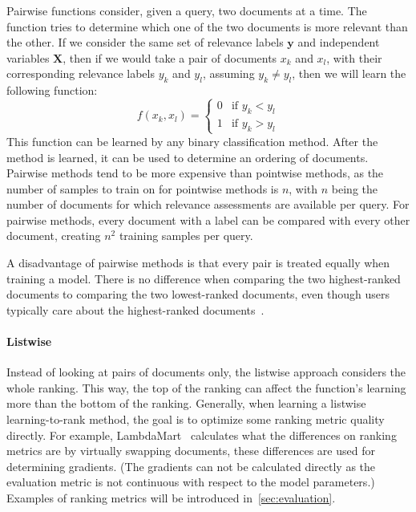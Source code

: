 Pairwise functions consider, given a query, two documents at a time. The function tries to determine which one of the two documents is more relevant than the other. If we consider the same set of relevance labels $\mathbf{y}$ and independent variables $\mathbf{X}$, then if we would take a pair of documents $x_k$ and $x_l$, with their corresponding relevance labels $y_k$ and $y_l$, assuming $y_k \neq y_l$, then we will learn the following function:
\begin{equation}
	f(x_k, x_l) = \begin{cases}
		0 & \text{if } y_k < y_l \\
		1 & \text{if } y_k > y_l
	\end{cases}
\end{equation}
This function can be learned by any binary classification method. After the method is learned, it can be used to determine an ordering of documents. 
Pairwise methods tend to be more expensive than pointwise methods, as the number of samples to train on for pointwise methods is $n$, with $n$ being the number of documents for which relevance assessments are available per query. For pairwise methods, every document with a label can be compared with every other document, creating $n^2$ training samples per query. 

A disadvantage of pairwise methods is that every pair is treated equally when training a model. There is no difference when comparing the two highest-ranked documents to comparing the two lowest-ranked documents, even though users typically care about the highest-ranked documents~\citep{pres-bias}. 

\paragraph{Listwise} Instead of looking at pairs of documents only, the listwise approach considers the whole ranking. This way, the top of the ranking can affect the function's learning more than the bottom of the ranking. Generally, when learning a listwise learning-to-rank method, the goal is to optimize some ranking metric quality directly. For example, LambdaMart~\cite{lambdamart} calculates what the differences on ranking metrics are by virtually swapping documents, these differences are used for determining gradients. (The gradients can not be calculated directly as the evaluation metric is not continuous with respect to the model parameters.) Examples of ranking metrics will be introduced in~\cref{sec:evaluation}.

